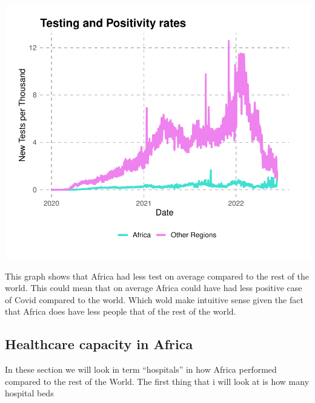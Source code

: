 \documentclass[12pt,preprint, authoryear]{elsarticle}
\let\origfigure\figure
\let\endorigfigure\endfigure
\renewenvironment{figure}[1][2] {
    \expandafter\origfigure\expandafter[H]
} {
    \endorigfigure
}
\numberwithin{equation}{section}
\numberwithin{figure}{section}
\numberwithin{table}{section}
\begin{document}
\begin{Shaded}
\begin{Highlighting}[]
\end{Highlighting}
\end{Shaded}

\begin{figure}

{\centering \includegraphics{Q1_files/figure-latex/Figure2-1} 

}

\caption{Testing rates \label{Figure2}}\label{fig:Figure2}
\end{figure}

This graph shows that Africa had less test on average compared to the
rest of the world. This could mean that on average Africa could have had
less positive case of Covid compared to the world. Which wold make
intuitive sense given the fact that Africa does have less people that of
the rest of the world.

\hypertarget{healthcare-capacity-in-africa}{%
\subsection{Healthcare capacity in
Africa}\label{healthcare-capacity-in-africa}}

In these section we will look in term ``hospitals'' in how Africa
performed compared to the rest of the World. The first thing that i will
look at is how many hospital beds

\begin{Shaded}
\begin{Highlighting}[]
\end{Highlighting}
\end{Shaded}
\end{document}
